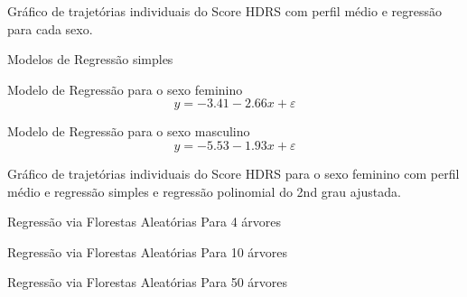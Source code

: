 \begin{frame}{Gráfico de trajetórias individuais do Score HDRS  com perfil médio e regressão para cada sexo.}
	
	\centering
	
\end{frame}

\begin{frame}{Modelos de Regressão simples}
	\begin{block}{Modelo de Regressão para o sexo feminino}
		$$
		y = -3.41 - 2.66x + \varepsilon
		$$
	\end{block}
	\begin{block}{Modelo de Regressão para o sexo masculino}
		$$
		y = -5.53 - 1.93x + \varepsilon
		$$
	\end{block}
\end{frame}

\begin{frame}{}
	Gráfico de trajetórias individuais do Score HDRS para o sexo feminino com perfil médio e regressão simples e regressão polinomial do 2nd grau ajustada.
	\centering
	
\end{frame}

\begin{frame}{}
	\centering
	
\end{frame}


\begin{frame}{Regressão via Florestas Aleatórias}
	Para 4 árvores
	\centering
	
\end{frame}

\begin{frame}{Regressão via Florestas Aleatórias}
	Para 10 árvores
	\centering
	
\end{frame}

\begin{frame}{Regressão via Florestas Aleatórias}
	Para 50 árvores
	\centering
	
\end{frame}

